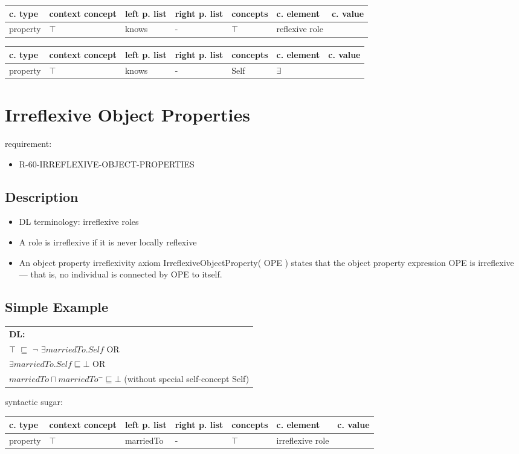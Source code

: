 \documentclass{llncs}
\newenvironment{gcotable}{
  \scriptsize
  \sffamily
  \vspace{0.3cm}
  \begin{tabular}{l|l|l|l|l|l|l}
  \hline
  \textbf{c. type} & \textbf{context concept} & \textbf{left p. list} & \textbf{right p. list} & \textbf{concepts} & \textbf{c. element} & \textbf{c. value} \\
  \hline

}{
  \hline
  \end{tabular}
  \linebreak
}
\newenvironment{DL}{
  \scriptsize
  \sffamily
  \vspace{0.3cm}
  \begin{tabular}{l}
	\textbf{DL:} \\

}{
  \end{tabular}
  \linebreak
}
\begin{document}
\begin{gcotable}
property & $\top$ & knows & - & $\top$ & reflexive role \\
\end{gcotable}

\begin{gcotable}
property & $\top$ & knows & - & Self & $\exists$ \\
\end{gcotable}

\section{Irreflexive Object Properties}

requirement:

\begin{itemize}
	\item R-60-IRREFLEXIVE-OBJECT-PROPERTIES
\end{itemize}

\subsection{Description}

\begin{itemize}
	\item DL terminology: irreflexive roles
  \item A role is irreflexive if it is never locally reflexive \cite{Kroetzsch2012}
	\item An object property irreflexivity axiom IrreflexiveObjectProperty( OPE ) states that the object property expression OPE is irreflexive — that is, no individual is connected by OPE to itself. 
\end{itemize}

\subsection{Simple Example}

\begin{DL}
$\top$ $\sqsubseteq$ $\neg$ $\exists  marriedTo . Self$   OR\\
$\exists marriedTo . Self \sqsubseteq \bot$  OR\\
$marriedTo \sqcap marriedTo^{-} \sqsubseteq \bot$ (without special self-concept Self)
\end{DL}

syntactic sugar:

\begin{gcotable}
property & $\top$ & marriedTo & - & $\top$ & irreflexive role \\
\end{gcotable}
\end{document}
